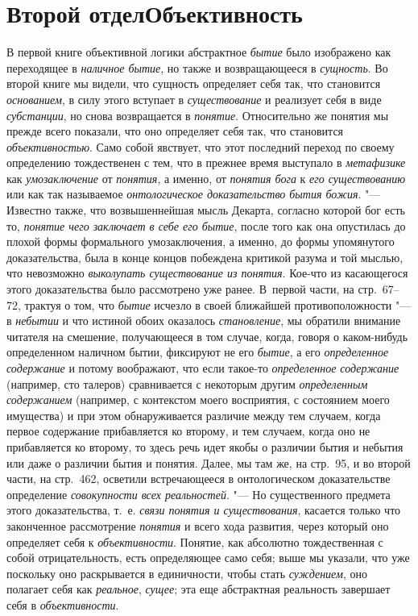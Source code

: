 {{\clearpage\part[Второй отдел\newline ОБЪЕКТИВНОСТЬ]{Второй отдел\newline Объективность}
В первой книге объективной логики абстрактное {\em бытие} было
изображено как переходящее в {\em наличное бытие}, но
также и возвращающееся в {\em сущность}. Во второй
книге мы видели, что сущность определяет себя так, что становится
{\em основанием}, в силу этого вступает в {\em существование}
и реализует себя в виде {\em субстанции}, но
снова возвращается в {\em понятие}.
Относительно же понятия мы прежде всего показали, что оно
определяет себя так, что становится {\em объективностью}.
Само собой явствует, что этот последний переход по своему
определению тождественен с тем, что в прежнее время выступало в
{\em метафизике} как {\em умозаключение} от {\em понятия}, а именно,
от {\em понятия бога} к {\em его существованию} или как так называемое
{\em онтологическое доказательство бытия
божия}. "--- Известно также, что возвышеннейшая мысль Декарта,
согласно которой бог есть то, {\em понятие чего заключает в себе его
бытие}, после того как она опустилась до плохой формы
формального умозаключения, а именно, до формы упомянутого доказательства,
была в конце концов побеждена критикой разума и той мыслью, что невозможно
{\em выколупать существование из
понятия}. Кое-что из касающегося этого доказательства было
рассмотрено уже ранее. В~первой части, на стр.~67--72, трактуя о том, что
{\em бытие} исчезло в своей ближайшей противоположности "--- в
{\em небытии} и что истиной обоих оказалось {\em становление}, мы
обратили внимание читателя на смешение, получающееся в том случае, когда,
говоря о каком-нибудь определенном наличном бытии, фиксируют не его
{\em бытие}, а его {\em определенное содержание}
и потому воображают, что если такое-то {\em определенное содержание}
(например, сто талеров) сравнивается с некоторым другим
{\em определенным содержанием}
(например, с контекстом моего восприятия, с состоянием моего
имущества) и при этом обнаруживается различие между тем случаем, когда
первое содержание прибавляется ко второму, и тем случаем, когда оно не
прибавляется ко второму, то здесь речь идет якобы о различии бытия и
небытия или даже о различии бытия и понятия. Далее, мы там же, на стр.~95,
и во второй части, на стр.~462, осветили встречающееся в онтологическом
доказательстве определение {\em совокупности всех реальностей}. "---
Но существенного предмета этого доказательства, т.~е.
{\em связи понятия и существования},
касается только что законченное рассмотрение {\em понятия} и всего
хода развития, через который оно определяет себя к {\em объективности}.
Понятие, как абсолютно тождественная с собой отрицательность,
есть определяющее само себя; выше мы указали, что уже поскольку оно
раскрывается в единичности, чтобы стать {\em суждением}, оно
полагает себя как {\em реальное}, {\em сущее}; эта еще
абстрактная реальность завершает себя в {\em объективности}.

}}
